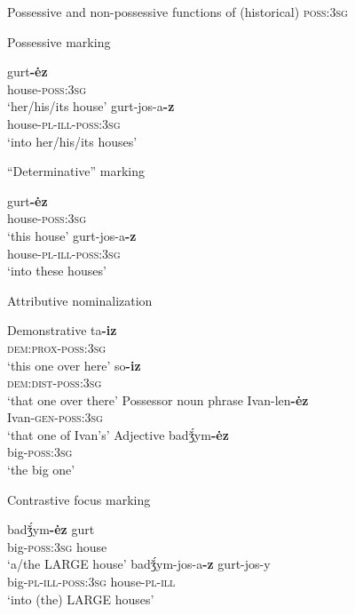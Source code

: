 \begin{exe}
\ex Possessive and non-possessive functions of (historical) \textsc{poss:3sg}
\begin{xlist}
\ex Possessive marking \label{udmurt possmarking}
\begin{xlist}
\ex	
\gll	gurt\textbf{-ėz}\\
	house-\textsc{poss:3sg}\\
\glt	‘her/his/its house’
\ex	
\gll	gurt-jos-a\textbf{-z}\\
	house-\textsc{pl}-\textsc{ill}-\textsc{poss:3sg}\\
\glt	‘into her/his/its houses’
\end{xlist}
\ex “Determinative” marking
\begin{xlist}
\ex	
\gll	gurt\textbf{-ėz}\\
	house-\textsc{poss:3sg}\\
\glt	‘this house’
\ex	
\gll	gurt-jos-a\textbf{-z}\\
	house-\textsc{pl}-\textsc{ill}-\textsc{poss:3sg}\\
\glt	‘into these houses’
\end{xlist}
\ex	Attributive nominalization \label{udmurt diachr nomzr}
\begin{xlist}
\ex Demonstrative \label{udmurt diachr dem-nomzr}
\gll	ta\textbf{-iz}\\
 	\textsc{dem:prox}-\textsc{poss:3sg}\\
\glt	‘this one over here’
\gll	so\textbf{-iz}\\
 	\textsc{dem:dist}-\textsc{poss:3sg}\\
\glt	‘that one over there’
\ex 	Possessor noun phrase \label{udmurt diachr gen-nomzr}
\gll	Ivan-len\textbf{-ėz}\\
	Ivan-\textsc{gen}-\textsc{poss:3sg}\\
	 ‘that one of Ivan's’
\ex 	Adjective \label{udmurt diachr adj-nomzr}
\gll	badǯ́ym\textbf{-ėz}\\
	big-\textsc{poss:3sg}\\
	 ‘the big one’
\end{xlist}
\ex Contrastive focus marking \label{udmurt diachr contr}
\begin{xlist}
\ex	
\gll	badǯ́ym\textbf{-ėz} gurt\\
	big-\textsc{poss:3sg} house\\
\glt	‘a/the LARGE house’
\ex	
\gll	badǯ́ym-jos-a\textbf{-z} gurt-jos-y\\
	big-\textsc{pl}-\textsc{ill}-\textsc{poss:3sg} house-\textsc{pl}-\textsc{ill}\\
	‘into (the) LARGE houses’
\end{xlist}
\end{xlist}
\end{exe}
